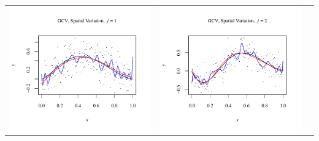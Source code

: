 \documentclass[11pt]{article}
\begin{document}
\begin{table}[h!]
  \begin{center}
    \renewcommand{\arraystretch}{1.5}
    \begin{tabular}{| >{\centering\arraybackslash}m{2.1in} |  >{\centering\arraybackslash}m{2.1in} |  >{\centering\arraybackslash}m{2.1in}|}
      \hline
      \includegraphics[width=1\linewidth,height=0.18\textheight]{Graphs/2/3/assignment5_a_2_3_1}&
      \includegraphics[width=1\linewidth,height=0.18\textheight]{Graphs/2/3/assignment5_a_2_3_2}&

\end{tabular}
\end{center}
\end{table}
\end{document}
